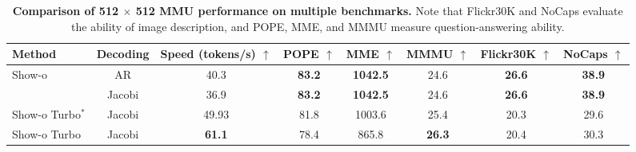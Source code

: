 



\begin{table*}[htbp]
    \centering
    \setlength{\tabcolsep}{3pt}
    \begin{threeparttable}
        \begin{tabular}{lc|c|ccc|cc}
            \toprule
            \textbf{Method} & \textbf{Decoding}  & \textbf{Speed (tokens/s) \large$\uparrow$} & \textbf{POPE \large$\uparrow$} & \textbf{MME \large$\uparrow$}  & \textbf{MMMU \large$\uparrow$} & \textbf{Flickr30K \large$\uparrow$}  &\textbf{NoCaps \large$\uparrow$} \\
            \midrule
            \multirow{2}{*}{Show-o} & AR &  40.3 & \textbf{83.2} & \textbf{1042.5}  & 24.6 & \textbf{26.6} & \textbf{38.9} \\
            & Jacobi &  36.9 & \textbf{83.2} & \textbf{1042.5}  & 24.6 & \textbf{26.6} & \textbf{38.9} \\
            \midrule
            Show-o Turbo$^{*}$ & Jacobi & 49.93 & 81.8 & 1003.6 & 25.4 & 20.3 & 29.6 \\
            Show-o Turbo & Jacobi & \textbf{61.1} & 78.4 & 865.8 & \textbf{26.3} & 20.4 & 30.3 \\
            \bottomrule
        \end{tabular}
    \end{threeparttable}%
    \caption{\textbf{Comparison of 512 $\times$ 512 MMU performance on multiple benchmarks.}
    Note that Flickr30K and NoCaps evaluate the ability of image description, and POPE, MME, and MMMU measure question-answering ability.}
    \label{tab:speed_comparison}
\end{table*}


